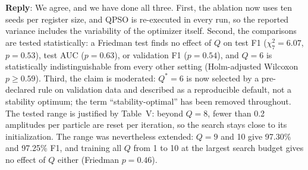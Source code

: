 \documentclass[11pt]{article}
\newcommand{\reply}{\noindent\textbf{Reply}: }
\begin{document}
\reply We agree, and we have done all three. First, the ablation now uses
ten seeds per register size, and QPSO is re-executed in every run, so the
reported variance includes the variability of the optimizer itself. Second,
the comparisons are tested statistically: a Friedman test finds no effect of
$Q$ on test F1 ($\chi^2_7=6.07$, $p=0.53$), test AUC ($p=0.63$), or
validation F1 ($p=0.54$), and $Q=6$ is statistically indistinguishable from
every other setting (Holm-adjusted Wilcoxon $p\ge0.59$). Third, the claim is
moderated: $Q^{*}=6$ is now selected by a pre-declared rule on validation
data and described as a reproducible default, not a stability optimum; the
term ``stability-optimal'' has been removed throughout. The tested range is
justified by Table~V: beyond $Q=8$, fewer than 0.2 amplitudes per particle
are reset per iteration, so the search stays close to its initialization.
The range was nevertheless extended: $Q=9$ and 10 give 97.30\% and 97.25\%
F1, and training all $Q$ from 1 to 10 at the largest search budget gives no
effect of $Q$ either (Friedman $p=0.46$).
\end{document}
